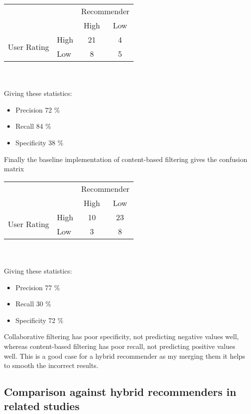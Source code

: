 \documentclass[conference]{IEEEtran}
\begin{document}
\begin{tabular}{l|l|c|c|}
    \multicolumn{2}{c}{}&\multicolumn{2}{c}{Recommender}\\
    \cline{3-4}
    \multicolumn{2}{c|}{}&High&Low\\
    \cline{2-4}
    \multirow{2}{*}{User Rating}& High & 21 & 4\\
    \cline{2-4}
    & Low & 8 & 5\\
    \cline{2-4}

\end{tabular}
\\
\\
Giving these statistics:
\begin{itemize}
    \item Precision 72 \%
    \item Recall 84 \%
    \item Specificity 38 \%
\end{itemize}

Finally the baseline implementation of content-based filtering gives the confusion matrix
\begin{tabular}{l|l|c|c|}
    \multicolumn{2}{c}{}&\multicolumn{2}{c}{Recommender}\\
    \cline{3-4}
    \multicolumn{2}{c|}{}&High&Low\\
    \cline{2-4}
    \multirow{2}{*}{User Rating}& High & 10 & 23\\
    \cline{2-4}
    & Low & 3 & 8\\
    \cline{2-4}

\end{tabular}
\\
\\
Giving these statistics:
\begin{itemize}
    \item Precision 77 \%
    \item Recall 30 \%
    \item Specificity 72 \%
\end{itemize}

Collaborative filtering has poor specificity, not predicting negative values well, whereas content-based filtering has poor recall, not predicting positive values well. This is a good case for a hybrid recommender as my merging them it helps to smooth the incorrect results.

\subsection{Comparison against hybrid recommenders in related studies}
\end{document}
